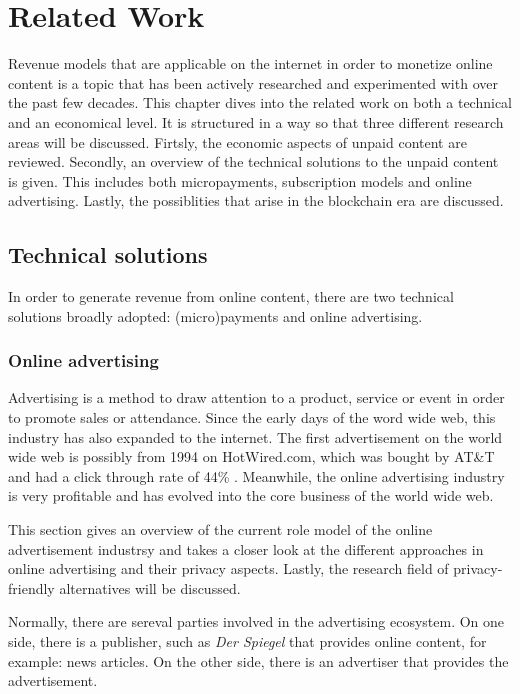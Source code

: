 \chapter{Related Work}
\label{cha:relatedwork}

Revenue models that are applicable on the internet in order to monetize online content is a topic that has been actively researched and experimented with over the past few decades. This chapter dives into the related work on both a technical and an economical level. It is structured in a way so that three different research areas will be discussed. Firtsly, the economic aspects of unpaid content are reviewed. Secondly, an overview of the technical solutions to the unpaid content is given. This includes both micropayments, subscription models and online advertising. Lastly, the possiblities that arise in the blockchain era are discussed.


\section{Technical solutions}

In order to generate revenue from online content, there are two technical solutions broadly adopted: (micro)payments and online advertising. 

\subsection{Online advertising}
Advertising is a method to draw attention to a product, service or event in order to promote sales or attendance. Since the early days of the word wide web, this industry has also expanded to the internet. The first advertisement on the world wide web is possibly from 1994 on HotWired.com, which was bought by AT\&T and had a click through rate of 44\% \cite{firstbanner}. Meanwhile, the online advertising industry is very profitable and has evolved into the core business of the world wide web.

This section gives an overview of the current role model of the online advertisement industrsy and takes a closer look at the different approaches in online advertising and their privacy aspects. Lastly, the research field of privacy-friendly alternatives will be discussed. 

Normally, there are sereval parties involved in the advertising ecosystem. On one side, there is a publisher, such as \textit{Der Spiegel} that provides online content, for example: news articles. On the other side, there is an advertiser that provides the advertisement.

